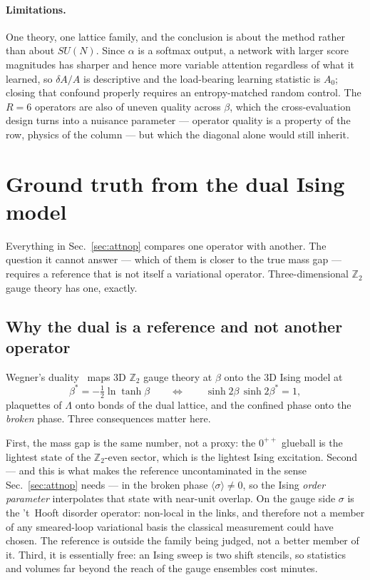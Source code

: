 \documentclass[aps,prl,reprint,superscriptaddress,nofootinbib]{revtex4-2}
\newcommand{\Zt}{\mathbb{Z}_2}
\begin{document}
\paragraph{Limitations.} One theory, one lattice family, and the conclusion is
about the method rather than about $SU(N)$. Since $\alpha$ is a softmax output, a
network with larger score magnitudes has sharper and hence more variable
attention regardless of what it learned, so $\delta A/A$ is descriptive and the
load-bearing learning statistic is $A_0$; closing that confound properly
requires an entropy-matched random control. The $R=6$ operators are also of
uneven quality across $\beta$, which the cross-evaluation design turns into a
nuisance parameter --- operator quality is a property of the row, physics of the
column --- but which the diagonal alone would still inherit.

\section{Ground truth from the dual Ising model}
\label{sec:dual}

Everything in Sec.~\ref{sec:attnop} compares one operator with another. The
question it cannot answer --- which of them is closer to the true mass gap ---
requires a reference that is not itself a variational operator. Three-dimensional
$\Zt$ gauge theory has one, exactly.

\subsection{Why the dual is a reference and not another operator}

Wegner's duality~\cite{Wegner1971} maps 3D $\Zt$ gauge theory at $\beta$ onto the
3D Ising model at
\begin{equation}
  \beta^\ast=-\tfrac12\ln\tanh\beta
  \qquad\Longleftrightarrow\qquad
  \sinh2\beta\,\sinh2\beta^\ast=1,
  \label{eq:duality}
\end{equation}
plaquettes of $\Lambda$ onto bonds of the dual lattice, and the confined phase
onto the \emph{broken} phase. Three consequences matter here.

First, the mass gap is the same number, not a proxy: the $0^{++}$ glueball is the
lightest state of the $\Zt$-even sector, which is the lightest Ising excitation.
Second --- and this is what makes the reference uncontaminated in the sense
Sec.~\ref{sec:attnop} needs --- in the broken phase $\langle\sigma\rangle\ne0$, so
the Ising \emph{order parameter} interpolates that state with near-unit overlap.
On the gauge side $\sigma$ is the 't~Hooft disorder operator: non-local in the
links, and therefore not a member of any smeared-loop variational basis the
classical measurement could have chosen. The reference is outside the family
being judged, not a better member of it. Third, it is essentially free: an Ising
sweep is two shift stencils, so statistics and volumes far beyond the reach of
the gauge ensembles cost minutes.
\end{document}
